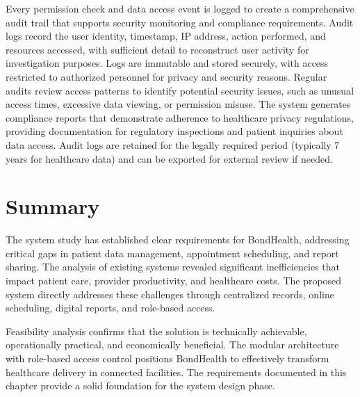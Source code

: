 \justifying
\noindent Every permission check and data access event is logged to create a comprehensive audit trail that supports security monitoring and compliance requirements. Audit logs record the user identity, timestamp, IP address, action performed, and resources accessed, with sufficient detail to reconstruct user activity for investigation purposes. Logs are immutable and stored securely, with access restricted to authorized personnel for privacy and security reasons. Regular audits review access patterns to identify potential security issues, such as unusual access times, excessive data viewing, or permission misuse. The system generates compliance reports that demonstrate adherence to healthcare privacy regulations, providing documentation for regulatory inspections and patient inquiries about data access. Audit logs are retained for the legally required period (typically 7 years for healthcare data) and can be exported for external review if needed.

\section{Summary}

\justifying
\noindent The system study has established clear requirements for BondHealth, addressing critical gaps in patient data management, appointment scheduling, and report sharing. The analysis of existing systems revealed significant inefficiencies that impact patient care, provider productivity, and healthcare costs. The proposed system directly addresses these challenges through centralized records, online scheduling, digital reports, and role-based access.

\justifying
\noindent Feasibility analysis confirms that the solution is technically achievable, operationally practical, and economically beneficial. The modular architecture with role-based access control positions BondHealth to effectively transform healthcare delivery in connected facilities. The requirements documented in this chapter provide a solid foundation for the system design phase.